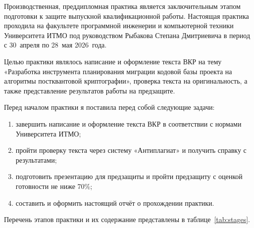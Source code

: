 \documentclass{itmo-vkr}
\begin{document}
\tableofcontents
\newpage


Производственная, преддипломная практика является заключительным этапом подготовки к защите выпускной квалификационной работы. Настоящая практика проходила на факультете программной инженерии и компьютерной техники Университета ИТМО под руководством Рыбакова Степана Дмитриевича в период с 30~апреля по 28~мая 2026~года.

Целью практики являлось написание и оформление текста ВКР на тему «Разработка инструмента планирования миграции кодовой базы проекта на алгоритмы постквантовой криптографии», проверка текста на оригинальность, а также представление результатов работы на предзащите.

Перед началом практики я поставила перед собой следующие задачи:

\begin{enumerate}
    \item завершить написание и оформление текста ВКР в соответствии с нормами Университета ИТМО;
    \item пройти проверку текста через систему «Антиплагиат» и получить справку с результатами;
    \item подготовить презентацию для предзащиты и пройти предзащиту с оценкой готовности не ниже 70\%;
    \item составить и оформить настоящий отчёт о прохождении практики.
\end{enumerate}

Перечень этапов практики и их содержание представлены в таблице~\ref{tab:stages}.
\end{document}
